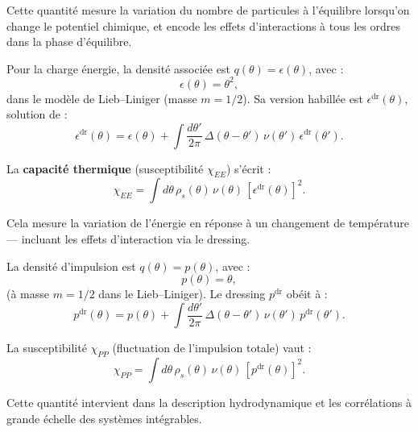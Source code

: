 {\begin{mdframed}
\vspace{1mm}
Cette quantité mesure la variation du nombre de particules à l'équilibre lorsqu'on change le potentiel chimique, et encode les effets d’interactions à tous les ordres dans la phase d’équilibre.

\end{mdframed}
\begin{mdframed}[
	linewidth=0.5pt, 
	backgroundcolor=gray!5, 
	roundcorner=50pt,	
	innerleftmargin=5pt,
    innerrightmargin=5pt,
    innertopmargin=5pt,
    innerbottommargin=2pt,
    leftmargin=2pt,
    rightmargin=2pt
	]

Pour la charge énergie, la densité associée est $q(\theta) = \epsilon(\theta)$, avec :
\[
\epsilon(\theta) = \theta^2,
\]
dans le modèle de Lieb–Liniger (masse $m=1/2$). Sa version habillée est $\epsilon^{\mathrm{dr}}(\theta)$, solution de :
\[
\epsilon^{\mathrm{dr}}(\theta) = \epsilon(\theta) + \int \frac{d\theta'}{2\pi}\, \Delta(\theta - \theta')\, \nu(\theta')\, \epsilon^{\mathrm{dr}}(\theta').
\]

\vspace{1mm}
La \textbf{capacité thermique} (susceptibilité $\chi_{EE}$) s’écrit :
\[
\chi_{EE} = \int d\theta\, \rho_s(\theta)\, \nu(\theta)\, [\epsilon^{\mathrm{dr}}(\theta)]^2.
\]

Cela mesure la variation de l’énergie en réponse à un changement de température — incluant les effets d’interaction via le dressing.
\end{mdframed}
\begin{mdframed}[
	linewidth=0.5pt, 
	backgroundcolor=gray!5, 
	roundcorner=50pt,	
	innerleftmargin=5pt,
    innerrightmargin=5pt,
    innertopmargin=5pt,
    innerbottommargin=2pt,
    leftmargin=2pt,
    rightmargin=2pt
	]
	
La densité d’impulsion est $q(\theta) = p(\theta)$, avec :
\[
p(\theta) = \theta,
\]
(à masse $m=1/2$ dans le Lieb–Liniger). Le dressing $p^{\mathrm{dr}}$ obéit à :
\[
p^{\mathrm{dr}}(\theta) = p(\theta) + \int \frac{d\theta'}{2\pi}\, \Delta(\theta - \theta')\, \nu(\theta')\, p^{\mathrm{dr}}(\theta').
\]

\vspace{1mm}
La susceptibilité $\chi_{PP}$ (fluctuation de l’impulsion totale) vaut :
\[
\chi_{PP} = \int d\theta\, \rho_s(\theta)\, \nu(\theta)\, [p^{\mathrm{dr}}(\theta)]^2.
\]

Cette quantité intervient dans la description hydrodynamique et les corrélations à grande échelle des systèmes intégrables.
\end{mdframed}


}

